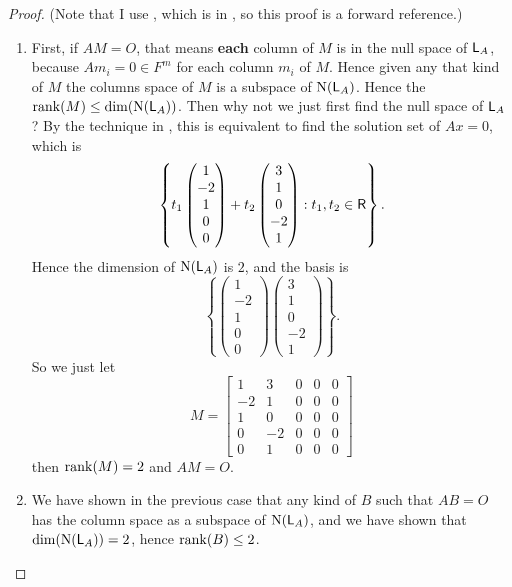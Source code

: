 \begin{proof}
(Note that I use , which is in , so this proof is a forward reference.)
\begin{enumerate}
\item
First, if \(AM = O\), that means \textbf{each} column of \(M\) is in the null space of \(\textsf{L}_A\), because \(A m_i = 0 \in F^m\) for each column \(m_i\) of \(M\).
Hence given any that kind of \(M\) the columns space of \(M\) is a subspace of \(\mathrm{N}(\textsf{L}_A)\).
Hence the \(\mathrm{rank}(M) \le \dim(\mathrm{N}(\textsf{L}_A))\).
Then why not we just first find the null space of \(\textsf{L}_A\)?
By the technique in , this is equivalent to find the solution set of \(Ax = 0\),
which is
\[
    \left\{
        t_1 \begin{pmatrix} 1 \\ -2 \\ 1 \\ 0 \\ 0 \end{pmatrix}
        + t_2 \begin{pmatrix} 3 \\ 1 \\ 0 \\ -2 \\ 1 \end{pmatrix}
        : t_1, t_2 \in \textsf{R}
    \right\}.
\]
Hence the dimension of \(\mathrm{N}(\textsf{L}_A)\) is \(2\), and the basis is
\[
    \left\{
        \begin{pmatrix} 1 \\ -2 \\ 1 \\ 0 \\ 0 \end{pmatrix}
        \begin{pmatrix} 3 \\ 1 \\ 0 \\ -2 \\ 1 \end{pmatrix}
    \right\}.
\]
So we just let
\[
    M = \left[\begin{array}{ccccc}
        1 & 3 & 0 & 0 & 0 \\
        -2 & 1 & 0 & 0 & 0 \\
        1 & 0 & 0 & 0 & 0 \\
        0 & -2 & 0 & 0 & 0 \\
        0 & 1 & 0 & 0 & 0
    \end{array}\right]
\]
then \(\mathrm{rank}(M) = 2\) and \(AM = O\).

\item We have shown in the previous case that any kind of \(B\) such that \(AB = O\) has the column space as a subspace of \(\mathrm{N}(\textsf{L}_A)\), and we have shown that \(\dim(\mathrm{N}(\textsf{L}_A)) = 2\), hence \(\mathrm{rank}(B) \le 2\).
\end{enumerate}
\end{proof}

